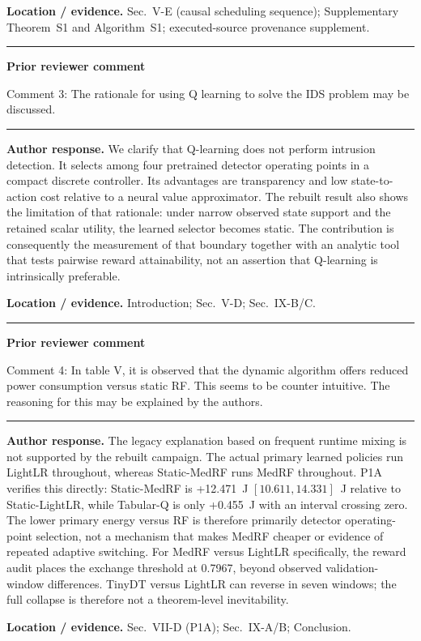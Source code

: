 \documentclass[11pt]{article}
\newenvironment{qbox}
    {\par\vspace{4pt}\noindent\begin{minipage}{\linewidth}\rule{\linewidth}{0.4pt}\par\noindent\textbf{Prior reviewer comment}\par\noindent}
    {\par\rule{\linewidth}{0.4pt}\end{minipage}\par\vspace{4pt}}
\begin{document}
\textbf{Location / evidence.} Sec.~V-E (causal scheduling sequence); Supplementary Theorem~S1 and Algorithm~S1; executed-source provenance supplement.

\begin{qbox}
Comment 3: The rationale for using Q learning to solve the IDS problem may be discussed.
\end{qbox}

\textbf{Author response.} We clarify that Q-learning does not perform intrusion detection. It selects among four pretrained detector operating points in a compact discrete controller. Its advantages are transparency and low state-to-action cost relative to a neural value approximator. The rebuilt result also shows the limitation of that rationale: under narrow observed state support and the retained scalar utility, the learned selector becomes static. The contribution is consequently the measurement of that boundary together with an analytic tool that tests pairwise reward attainability, not an assertion that Q-learning is intrinsically preferable.

\textbf{Location / evidence.} Introduction; Sec.~V-D; Sec.~IX-B/C.

\begin{qbox}
Comment 4: In table V, it is observed that the dynamic algorithm offers reduced power consumption versus static RF. This seems to be counter intuitive. The reasoning for this may be explained by the authors.
\end{qbox}

\textbf{Author response.} The legacy explanation based on frequent runtime mixing is not supported by the rebuilt campaign. The actual primary learned policies run LightLR throughout, whereas Static-MedRF runs MedRF throughout. P1A verifies this directly: Static-MedRF is +12.471~J $[10.611, 14.331]$~J relative to Static-LightLR, while Tabular-Q is only +0.455~J with an interval crossing zero. The lower primary energy versus RF is therefore primarily detector operating-point selection, not a mechanism that makes MedRF cheaper or evidence of repeated adaptive switching. For MedRF versus LightLR specifically, the reward audit places the exchange threshold at 0.7967, beyond observed validation-window differences. TinyDT versus LightLR can reverse in seven windows; the full collapse is therefore not a theorem-level inevitability.

\textbf{Location / evidence.} Sec.~VII-D (P1A); Sec.~IX-A/B; Conclusion.
\end{document}
